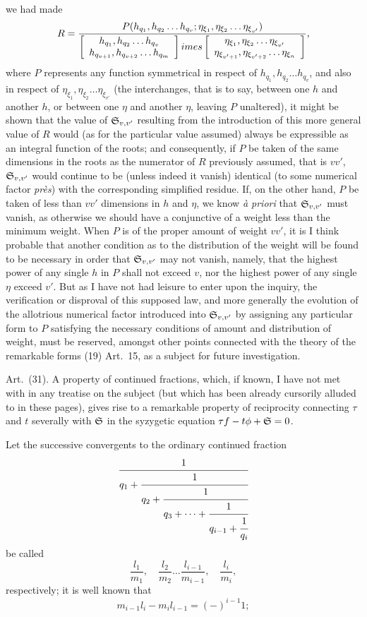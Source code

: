 \documentclass[11pt]{article}
\newcommand{\sourcepage}[1]{\marginpar{\scriptsize p.~#1}}
\newcommand{\art}[1]{\par\smallskip\noindent Art.~(#1).\quad}
\begin{document}
\sourcepage{479}
we had made
\[
R=\frac{P(h_{q_1},h_{q_2}\ldots h_{q_v};\eta_{\xi_1},\eta_{\xi_2}\ldots\eta_{\xi_{v'}})}
{\left[\begin{array}{c}h_{q_1},h_{q_2}\ldots h_{q_v}\\h_{q_{v+1}},h_{q_{v+2}}\ldots h_{q_m}\end{array}\right]	imes
\left[\begin{array}{c}\eta_{\xi_1},\eta_{\xi_2}\ldots\eta_{\xi_{v'}}\\\eta_{\xi_{v'+1}},\eta_{\xi_{v'+2}}\ldots\eta_{\xi_n}\end{array}\right]},
\]
where $P$ represents any function symmetrical in respect of $h_{q_1},h_{q_2}\ldots h_{q_v}$, and also in respect of $\eta_{\xi_1},\eta_{\xi_2}\ldots\eta_{\xi_{v'}}$ (the interchanges, that is to say, between one $h$ and another $h$, or between one $\eta$ and another $\eta$, leaving $P$ unaltered), it might be shown that the value of $\mathfrak{S}_{v,v'}$ resulting from the introduction of this more general value of $R$ would (as for the particular value assumed) always be expressible as an integral function of the roots; and consequently, if $P$ be taken of the same dimensions in the roots as the numerator of $R$ previously assumed, that is $vv'$, $\mathfrak{S}_{v,v'}$ would continue to be (unless indeed it vanish) identical (to some numerical factor \emph{près}) with the corresponding simplified residue. If, on the other hand, $P$ be taken of less than $vv'$ dimensions in $h$ and $\eta$, we know \emph{à priori} that $\mathfrak{S}_{v,v'}$ must vanish, as otherwise we should have a conjunctive of a weight less than the minimum weight. When $P$ is of the proper amount of weight $vv'$, it is I think probable that another condition as to the distribution of the weight will be found to be necessary in order that $\mathfrak{S}_{v,v'}$ may not vanish, namely, that the highest power of any single $h$ in $P$ shall not exceed $v$, nor the highest power of any single $\eta$ exceed $v'$. But as I have not had leisure to enter upon the inquiry, the verification or disproval of this supposed law, and more generally the evolution of the allotrious numerical factor introduced into $\mathfrak{S}_{v,v'}$ by assigning any particular form to $P$ satisfying the necessary conditions of amount and distribution of weight, must be reserved, amongst other points connected with the theory of the remarkable forms (19) Art.~15, as a subject for future investigation.

\art{31} A property of continued fractions, which, if known, I have not met with in any treatise on the subject (but which has been already cursorily alluded to in these pages), gives rise to a remarkable property of reciprocity connecting $\tau$ and $t$ severally with $\mathfrak{S}$ in the syzygetic equation $\tau f-t\phi+\mathfrak{S}=0$.

Let the successive convergents to the ordinary continued fraction
\[
\cfrac1{q_1+\cfrac1{q_2+\cfrac1{q_3+\cdots+\cfrac1{q_{i-1}+\cfrac1{q_i}}}}}
\]
be called
\[
\frac{l_1}{m_1},\quad \frac{l_2}{m_2}\ldots\frac{l_{i-1}}{m_{i-1}},\quad\frac{l_i}{m_i},
\]
respectively; it is well known that
\[
m_{i-1}l_i-m_il_{i-1}=(-)^{i-1}1;
\]
\end{document}

